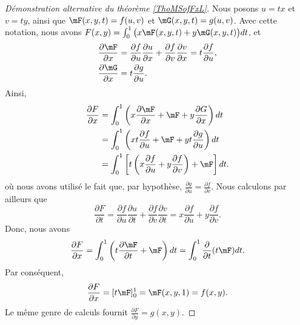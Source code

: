 \begin{proof}[Démonstration alternative du théorème \ref{ThoMSofFxL}]
Nous posons $u=tx$ et $v=ty$, ainsi que $\mF(x,y,t)=f(u,v)$ et $\mG(x,y,t)=g(u,v)$. Avec cette notation, nous avons $F(x,y)=\int_0^1\big( x\mF(x,y,t)+y\mG(x,y,t) \big)dt$, et
\begin{equation}
	\begin{aligned}[]
		\frac{ \partial \mF }{ \partial x }&=\frac{ \partial f }{ \partial u }\frac{ \partial u }{ \partial x }+\frac{ \partial f }{ \partial v }\frac{ \partial v }{ \partial x }=t\frac{ \partial f }{ \partial u },\\
		\frac{ \partial \mG }{ \partial x }&=t\frac{ \partial g }{ \partial u }.
	\end{aligned}
\end{equation}
Ainsi,
\begin{equation}
	\begin{aligned}[]
		\frac{ \partial F }{ \partial x }	&=\int_0^1\left( x\frac{ \partial \mF }{ \partial x }+\mF+y\frac{ \partial G }{ \partial x } \right)dt\\
							&=\int_0^1\left( xt\frac{ \partial f }{ \partial u } +\mF+yt\frac{ \partial g }{ \partial u } \right)dt\\
							&=\int_0^1\left[  t\left( x\frac{ \partial f }{ \partial u }+y\frac{ \partial f }{ \partial v } \right)+\mF  \right]dt.
	\end{aligned}
\end{equation}
où nous avons utilisé le fait que, par hypothèse, $\frac{ \partial g }{ \partial u }=\frac{ \partial f }{ \partial v }$. Nous calculons par ailleurs que
\begin{equation}
	\frac{ \partial F }{ \partial t }=\frac{ \partial f }{ \partial u }\frac{ \partial u }{ \partial t }+\frac{ \partial f }{ \partial v }\frac{ \partial v }{ \partial t }=x\frac{ \partial f }{ \partial u }+y\frac{ \partial f }{ \partial v }.
\end{equation}
Donc, nous avons
\begin{equation}
	\frac{ \partial F }{ \partial x }=\int_0^1\left( t\frac{ \partial \mF }{ \partial t }+\mF \right)dt=\int_0^1\frac{ \partial  }{ \partial t }(t\mF)dt.
\end{equation}
Par conséquent,
\begin{equation}
	\frac{ \partial F }{ \partial x }=[t\mF]_0^1=\mF(x,y,1)=f(x,y).
\end{equation}
Le même genre de calculs fournit $\frac{ \partial F }{ \partial y }=g(x,y)$.
\end{proof}

